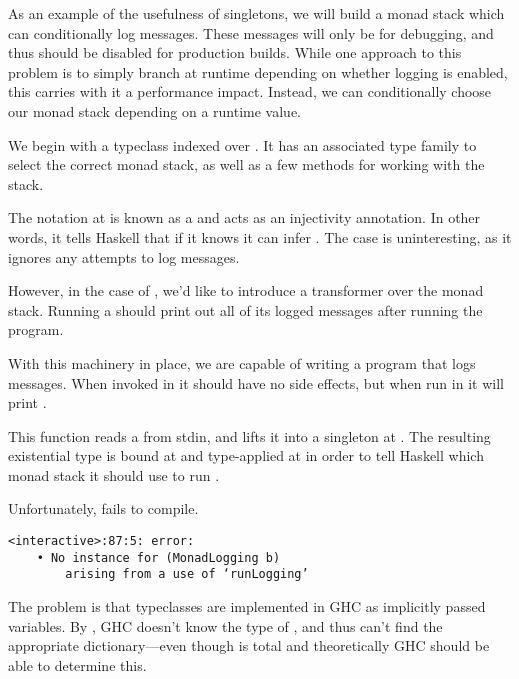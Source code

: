 \documentclass[book.tex]{subfiles}
\begin{document}
As an example of the usefulness of singletons, we will build a monad stack which
can conditionally log messages. These messages will only be for debugging, and
thus should be disabled for production builds. While one approach to this
problem is to simply branch at runtime depending on whether logging is enabled,
this carries with it a performance impact. Instead, we can conditionally choose
our monad stack depending on a runtime value.

We begin with a typeclass indexed over . It has an associated type
family to select the correct monad stack, as well as a few methods for working
with the stack.


The  notation at  is known as a  and acts as an injectivity annotation. In other words, it tells
Haskell that if it knows  it can infer . The
 case is uninteresting, as it ignores any attempts to log messages.


However, in the case of , we'd like to introduce a  transformer over the monad stack. Running a 
should print out all of its logged messages after running the program.


With this machinery in place, we are capable of writing a program that logs
messages. When invoked in  it should have no side
effects, but when run in  it will print .


This function reads a  from stdin, and lifts it into a singleton at
. The resulting existential type  is bound at  and
type-applied at  in order to tell Haskell which monad stack it should use
to run .

Unfortunately,  fails to compile.

\spaceMyBox
\begin{lstlisting}
<interactive>:87:5: error:
    • No instance for (MonadLogging b)
        arising from a use of ‘runLogging’
\end{lstlisting}
\spaceMyBox

The problem is that typeclasses are implemented in GHC as implicitly passed
variables. By , GHC doesn't know the type of , and thus can't find
the appropriate  dictionary---even though  is
total and theoretically GHC should be able to determine this.
\end{document}
